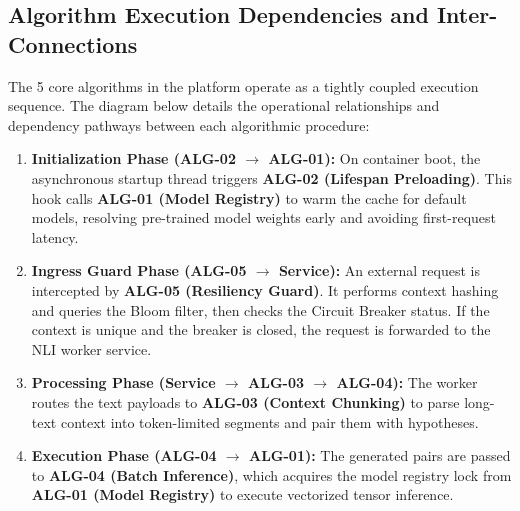\documentclass[11pt,a4paper]{article}
\theoremstyle{plain}
\theoremstyle{definition}
\theoremstyle{remark}
\begin{document}
\subsection{Algorithm Execution Dependencies and Inter-Connections}
The 5 core algorithms in the platform operate as a tightly coupled execution sequence. The diagram below details the operational relationships and dependency pathways between each algorithmic procedure:
\begin{enumerate}
    \item \textbf{Initialization Phase (ALG-02 $\to$ ALG-01):} On container boot, the asynchronous startup thread triggers \textbf{ALG-02 (Lifespan Preloading)}. This hook calls \textbf{ALG-01 (Model Registry)} to warm the cache for default models, resolving pre-trained model weights early and avoiding first-request latency.
    \item \textbf{Ingress Guard Phase (ALG-05 $\to$ Service):} An external request is intercepted by \textbf{ALG-05 (Resiliency Guard)}. It performs context hashing and queries the Bloom filter, then checks the Circuit Breaker status. If the context is unique and the breaker is closed, the request is forwarded to the NLI worker service.
    \item \textbf{Processing Phase (Service $\to$ ALG-03 $\to$ ALG-04):} The worker routes the text payloads to \textbf{ALG-03 (Context Chunking)} to parse long-text context into token-limited segments and pair them with hypotheses.
    \item \textbf{Execution Phase (ALG-04 $\to$ ALG-01):} The generated pairs are passed to \textbf{ALG-04 (Batch Inference)}, which acquires the model registry lock from \textbf{ALG-01 (Model Registry)} to execute vectorized tensor inference.
\end{enumerate}
\end{document}
